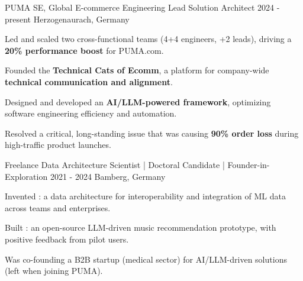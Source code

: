 {}

\vspace{2ex}

\begin{cventries}





      
  \cventry
    {PUMA SE, Global E-commerce Engineering}  %
    {Lead Solution Architect} %
    {2024 - present} %
    {Herzogenaurach, Germany} %
    {
      \begin{cvitems} %
	    \item {Led and scaled two cross-functional teams (4+4 engineers, +2 leads), driving a \textbf{20\% performance boost} for PUMA.com.}
	    \item {Founded the \textbf{Technical Cats of Ecomm}, a platform for company-wide \textbf{technical communication and alignment}.}
    	   	\item {Designed and developed an \textbf{AI/LLM-powered framework}, optimizing software engineering efficiency and automation.}					
	    \item {Resolved a critical, long-standing issue that was causing \textbf{90\% order loss} during high-traffic product launches.}
    \end{cvitems}
    }

\vspace{4ex}



        
  \cventry
    {Freelance}   %
    {Data Architecture Scientist | Doctoral Candidate | Founder-in-Exploration} %
    {2021 - 2024} %
    {Bamberg, Germany} %
    {
      \begin{cvitems} %
		\item {Invented : a data architecture for interoperability and integration of ML data across teams and enterprises.}
		\item {Built : an open-source LLM-driven music recommendation prototype, with positive feedback from pilot users.}
		\item {Was co-founding a B2B startup (medical sector) for AI/LLM-driven solutions (left when joining PUMA).}
    \end{cvitems}
    }
    

\end{cventries}

